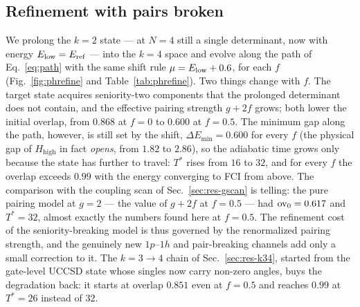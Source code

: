 \documentclass[
  aps,            %
  prc,            %
  reprint,        %
  superscriptaddress,
  floatfix,
  nofootinbib
]{revtex4-2}
\newcommand{\Hhigh}{H_{\mathrm{high}}}
\begin{document}
\subsection{Refinement with pairs broken}
\label{sec:ph-refine}
We prolong the $k=2$ state --- at $N=4$ still a single determinant, now with
energy $E_{\rm low}=E_{\rm ref}$ --- into the $k=4$ space and evolve along the
path of Eq.~\eqref{eq:path} with the same shift rule $\mu=E_{\rm low}+0.6$, for
each $f$ (Fig.~\ref{fig:phrefine} and Table~\ref{tab:phrefine}).  Two things
change with $f$.  The target state acquires seniority-two components that the
prolonged determinant does not contain, and the effective pairing strength
$g+2f$ grows; both lower the initial overlap, from $0.868$ at $f=0$ to $0.600$
at $f=0.5$.  The minimum gap along the path, however, is still set by the shift,
$\Delta E_{\min}=0.600$ for every $f$ (the physical gap of $\Hhigh$ in fact
\emph{opens}, from $1.82$ to $2.86$), so the adiabatic time grows only because
the state has further to travel: $T^{*}$ rises from $16$ to $32$, and for every
$f$ the overlap exceeds $0.99$ with the energy converging to FCI from above.
The comparison with the coupling scan of Sec.~\ref{sec:res-gscan} is telling:
the pure pairing model at $g=2$ --- the value of $g+2f$ at $f=0.5$ --- had
${\rm ov}_0=0.617$ and $T^{*}=32$, almost exactly the numbers found here at
$f=0.5$.  The refinement cost of the seniority-breaking model is thus governed
by the renormalized pairing strength, and the genuinely new $1p$--$1h$ and
pair-breaking channels add only a small correction to it.  The $k=3\to4$ chain
of Sec.~\ref{sec:res-k34}, started from the gate-level UCCSD state whose singles
now carry non-zero angles, buys the degradation back: it starts at overlap
$0.851$ even at $f=0.5$ and reaches $0.99$ at $T^{*}=26$ instead of $32$.
\end{document}
